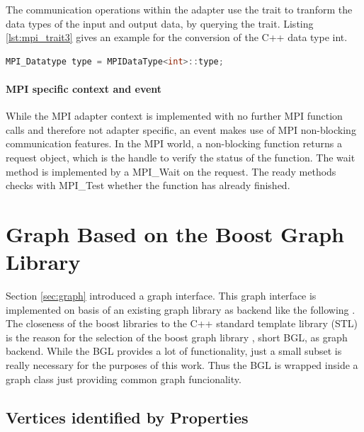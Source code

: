 The communication operations within the adapter use the trait to
tranform the data types of the input and output data, by querying the
trait. Listing \ref{lst:mpi_trait3} gives an example for the conversion 
of the C++ data type int.

\begin{lstlisting}[language=C++, label=lst:mpi_trait3]
  MPI_Datatype type = MPIDataType<int>::type;
\end{lstlisting}

\paragraph*{MPI specific context and event}
  
While the MPI adapter context is implemented with no further MPI
function calls and therefore not adapter specific, an event makes use
of MPI non-blocking communication features. In the MPI world, a
non-blocking function returns a request object, which is the handle to
verify the status of the function. The wait method is implemented by a
MPI\_Wait on the request. The ready methods checks with MPI\_Test
whether the function has already finished.

\section{Graph Based on the Boost Graph Library}

Section \ref{sec:graph} introduced a graph interface.  This graph
interface is implemented on basis of an existing graph library as
backend like the following
\cite{ref:lemon,ref:bgl,ref:igraph,ref:ogdf}.  The closeness of the
boost libraries to the C++ standard template library (STL) is the
reason for the selection of the boost graph library
\cite{ref:boost::bgl}, short BGL, as graph backend.  While the BGL
provides a lot of functionality, just a small subset is really
necessary for the purposes of this work. Thus the BGL is wrapped
inside a graph class just providing common graph funcionality.

\subsection{Vertices identified by Properties}

